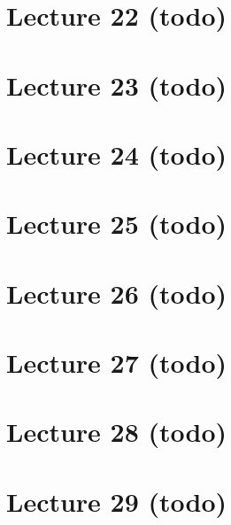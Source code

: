 \hypertarget{lecture-22-todo}{%
\section{Lecture 22 (todo)}\label{lecture-22-todo}}

\hypertarget{lecture-23-todo}{%
\section{Lecture 23 (todo)}\label{lecture-23-todo}}

\hypertarget{lecture-24-todo}{%
\section{Lecture 24 (todo)}\label{lecture-24-todo}}

\hypertarget{lecture-25-todo}{%
\section{Lecture 25 (todo)}\label{lecture-25-todo}}

\hypertarget{lecture-26-todo}{%
\section{Lecture 26 (todo)}\label{lecture-26-todo}}

\hypertarget{lecture-27-todo}{%
\section{Lecture 27 (todo)}\label{lecture-27-todo}}

\hypertarget{lecture-28-todo}{%
\section{Lecture 28 (todo)}\label{lecture-28-todo}}

\hypertarget{lecture-29-todo}{%
\section{Lecture 29 (todo)}\label{lecture-29-todo}}

\cleardoublepage

\renewcommand{\listtheoremname}{}
\listoftheorems[ignoreall,show={definition}, numwidth=3.5em]
\cleardoublepage

\renewcommand{\listtheoremname}{}
\listoftheorems[ignoreall,show={theorem,proposition}, numwidth=3.5em]
\cleardoublepage

\renewcommand{\listtheoremname}{}
\listoftheorems[ignoreall,show={exercise}, numwidth=3.5em]
\cleardoublepage

\listoffigures
\cleardoublepage


\printbibliography[title=Bibliography]



